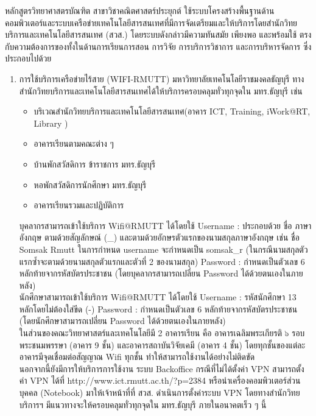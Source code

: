 หลักสูตรวิทยาศาสตรบัณฑิต สาขาวิชาคณิตศาสตร์ประยุกต์ ใช้ระบบโครงสร้างพื้นฐานด้านคอมพิวเตอร์และระบบเครือข่ายเทคโนโลยีสารสนเทศที่มีการจัดเตรียมและให้บริการโดยสำนักวิทยบริการและเทคโนโลยีสารสนเทศ (สวส.) โดยระบบดังกล่าวมีความทันสมัย เพียงพอ และพร้อมใช้ ตรงกับความต้องการของทั้งในด้านการเรียนการสอน การวิจัย การบริการวิชาการ และการบริหารจัดการ ซึ่งประกอบไปด้วย
\begin{enumerate}
	\item การใช้บริการเครือข่ายไร้สาย (WIFI-RMUTT) มหาวิทยาลัยเทคโนโลยีราชมงคลธัญบุรี ทางสำนักวิทยบริการและเทคโนโลยีสารสนเทศได้ให้บริการครอบคลุมทั่วทุกจุดใน มทร.ธัญบุรี เช่น
	\begin{itemize}[label=-]
	\item  บริเวณสำนักวิทยบริการและเทคโนโลยีสารสนเทศ\newline(อาคาร ICT, Training, iWork@RT, Library )
	\item อาคารเรียนตามคณะต่าง ๆ
	\item บ้านพักสวัสดิการ ข้าราชการ มทร.ธัญบุรี
	\item หอพักสวัสดิการนักศึกษา มทร.ธัญบุรี
	\item อาคารเรียนรวมและปฏิบัติการ
\end{itemize}
\hspace*{1cm}บุคลากรสามารถเข้าใช้บริการ Wifi@RMUTT ได้โดยใช้ Username : ประกอบด้วย ชื่อ
	ภาษาอังกฤษ ตามด้วยสัญลักษณ์ (\_) และตามด้วยอักษรตัวแรกของนามสกุลภาษาอังกฤษ เช่น ชื่อ Somsak Rmutt ในการกำหนด username จะกำหนดเป็น somsak\_r (ในกรณีนามสกุลตัวแรกซ้ำจะตามด้วยนามสกุลตัวแรกและตัวที่ 2 ของนามสกุล) Password : กำหนดเป็นตัวเลข 6 หลักท้ายจากรหัสบัตรประชาชน
	(โดยบุคลากรสามารถเปลี่ยน Password ได้ด้วยตนเองในภายหลัง) \\[0.2cm]
\hspace*{1cm}นักศึกษาสามารถเข้าใช้บริการ Wifi@RMUTT ได้โดยใช้ Username :  รหัสนักศึกษา 13 หลักโดยไม่ต้องใส่ขีด (-) Password : กำหนดเป็นตัวเลข 6 หลักท้ายจากรหัสบัตรประชาชน
(โดยนักศึกษาสามารถเปลี่ยน Password ได้ด้วยตนเองในภายหลัง)\\[0.2cm]
\hspace*{1cm}ในส่วนของคณะวิทยาศาสตร์และเทคโนโลยีมี 2 อาคารเรียน คือ อาคารเฉลิมพระเกียรติ ๖ รอบพระชนมพรรษา (อาคาร 9 ชั้น) และอาคารสถาบันวิจัยเคมี (อาคาร 4 ชั้น) โดยทุกชั้นของแต่ละอาคารมีจุดเชื่อมต่อสัญญาณ Wifi ทุกชั้น ทำให้สามารถใช้งานได้อย่างไม่ติดขัด \\[0.2cm]
\hspace*{1cm}นอกจากนี้ยังมีการให้บริการการใช้งาน ระบบ Backoffice กรณีที่ไม่ได้ตั้งค่า VPN สามารถตั้งค่า VPN ได้ที่ http://www.ict.rmutt.ac.th/?p=2384  หรือนำเครื่องคอมพิวเตอร์ส่วนบุคคล (Notebook) มาให้เจ้าหน้าที่ที่ สวส. ดำเนินการตั้งค่าระบบ VPN โดยทางสำนักวิทยบริการฯ มีแนวทางจะให้ครอบคลุมทั่วทุกจุดใน มทร.ธัญบุรี ภายในอนาคตเร็ว ๆ นี้

\end{enumerate}
